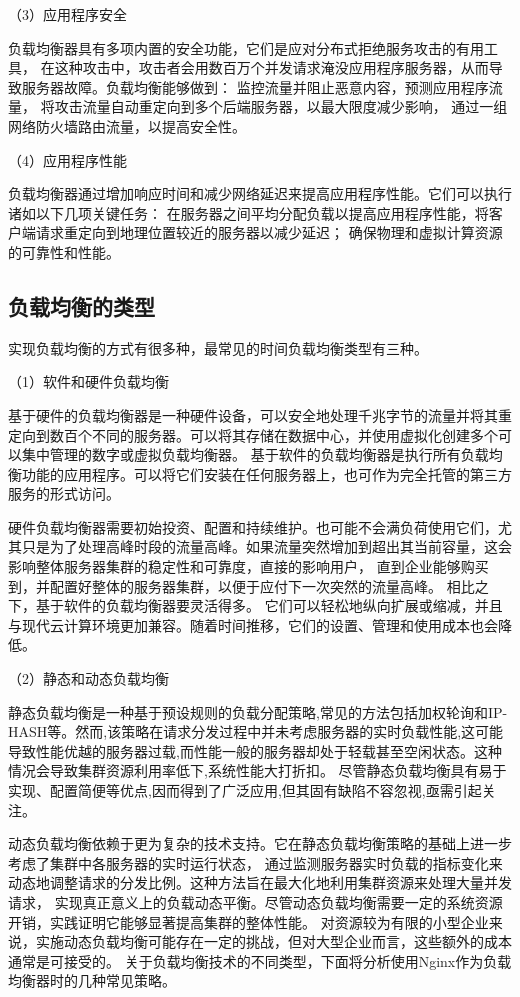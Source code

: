 （3）应用程序安全

负载均衡器具有多项内置的安全功能，它们是应对分布式拒绝服务攻击的有用工具，
在这种攻击中，攻击者会用数百万个并发请求淹没应用程序服务器，从而导致服务器故障。负载均衡能够做到：
监控流量并阻止恶意内容，预测应用程序流量，
将攻击流量自动重定向到多个后端服务器，以最大限度减少影响，
通过一组网络防火墙路由流量，以提高安全性。

（4）应用程序性能

负载均衡器通过增加响应时间和减少网络延迟来提高应用程序性能。它们可以执行诸如以下几项关键任务：
在服务器之间平均分配负载以提高应用程序性能，将客户端请求重定向到地理位置较近的服务器以减少延迟；
确保物理和虚拟计算资源的可靠性和性能。

\subsection{负载均衡的类型}

实现负载均衡的方式有很多种，最常见的时间负载均衡类型有三种。

（1）软件和硬件负载均衡

基于硬件的负载均衡器是一种硬件设备，可以安全地处理千兆字节的流量并将其重定向到数百个不同的服务器。可以将其存储在数据中心，并使用虚拟化创建多个可以集中管理的数字或虚拟负载均衡器。
基于软件的负载均衡器是执行所有负载均衡功能的应用程序。可以将它们安装在任何服务器上，也可作为完全托管的第三方服务的形式访问。

硬件负载均衡器需要初始投资、配置和持续维护。也可能不会满负荷使用它们，尤其只是为了处理高峰时段的流量高峰。如果流量突然增加到超出其当前容量，这会影响整体服务器集群的稳定性和可靠度，直接的影响用户，
直到企业能够购买到，并配置好整体的服务器集群，以便于应付下一次突然的流量高峰。
相比之下，基于软件的负载均衡器要灵活得多\cite{常智2013高性能}。
它们可以轻松地纵向扩展或缩减，并且与现代云计算环境更加兼容。随着时间推移，它们的设置、管理和使用成本也会降低。

（2）静态和动态负载均衡

静态负载均衡是一种基于预设规则的负载分配策略,常见的方法包括加权轮询和IP-HASH等。然而,该策略在请求分发过程中并未考虑服务器的实时负载性能,这可能导致性能优越的服务器过载,而性能一般的服务器却处于轻载甚至空闲状态。这种情况会导致集群资源利用率低下,系统性能大打折扣。
尽管静态负载均衡具有易于实现、配置简便等优点,因而得到了广泛应用,但其固有缺陷不容忽视,亟需引起关注。

动态负载均衡依赖于更为复杂的技术支持。它在静态负载均衡策略的基础上进一步考虑了集群中各服务器的实时运行状态，
通过监测服务器实时负载的指标变化来动态地调整请求的分发比例。这种方法旨在最大化地利用集群资源来处理大量并发请求，
实现真正意义上的负载动态平衡。尽管动态负载均衡需要一定的系统资源开销，实践证明它能够显著提高集群的整体性能。
对资源较为有限的小型企业来说，实施动态负载均衡可能存在一定的挑战，但对大型企业而言，这些额外的成本通常是可接受的。
关于负载均衡技术的不同类型，下面将分析使用Nginx作为负载均衡器时的几种常见策略。

